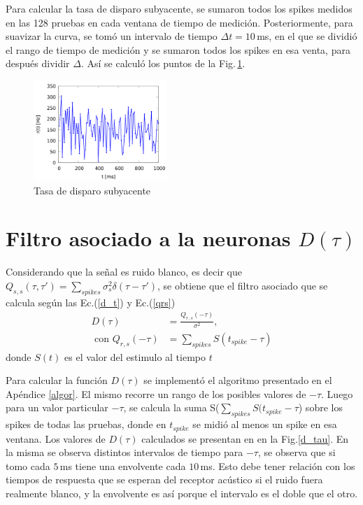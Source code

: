 Para calcular la tasa de disparo subyacente,  se sumaron todos los spikes medidos en las 128 pruebas en cada ventana de tiempo de medición. Posteriormente, para suavizar la curva, se tomó un intervalo de tiempo $\Delta t = 10\,$ms, en el que se dividió el rango de tiempo de medición y se sumaron todos los spikes en esa venta, para después dividir $\Delta$. Así se calculó los puntos de la Fig.\,\ref{r_t}.


\begin{figure}[H]
	\centering
	\includegraphics[width=0.45\textwidth]{../Graficos/r_t.png}
	\caption{Tasa de disparo subyacente}
	\label{r_t}
\end{figure}

\section*{Filtro asociado a la neuronas \texorpdfstring{$D(\tau)$}{}}

Considerando que la señal es ruido blanco, es decir que $Q_{s,s}(\tau, \tau')= \sum_{spikes} \sigma^2_s \delta(\tau-\tau')$, se obtiene que el filtro asociado que se  calcula  según las Ec.(\ref{d_t}) y Ec.(\ref{qrs}) 
\begin{align}
    D(\tau) &= \frac{Q_{r,s}(-\tau)}{\sigma^2}, \label{d_t}\\
    \text{  con } Q_{r,s}(-\tau)&= \sum_{spikes} S(t_{spike} - \tau) \label{qrs}
\end{align}
donde $S(t)$ es el valor del estimulo al tiempo $t$

Para calcular la función $D(\tau)$ se implementó  el  algoritmo presentado en el Apéndice \ref{algor}. El mismo recorre un rango de los posibles valores de $-\tau$. Luego para un valor particular $-\tau$, se calcula la suma S($\sum_{spikes} S(t_{spike} - \tau$) sobre los spikes de todas las pruebas, donde en $t_{spike}$ se midió al menos un spike en esa ventana. Los valores de $D(\tau)$ calculados se presentan en en la Fig.\ref{d_tau}. En la misma se observa distintos intervalos de tiempo para $-\tau$, se observa que si tomo cada $5\,$ms tiene una envolvente cada $10\,$ms. Esto debe tener relación con los tiempos de respuesta que se esperan del receptor acústico si el ruido fuera realmente blanco, y la envolvente es así porque el intervalo es el doble que el otro.

